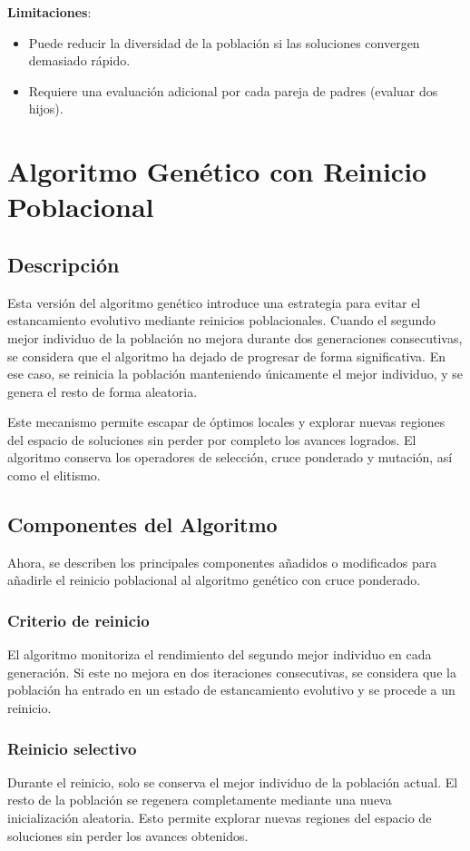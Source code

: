 \textbf{Limitaciones}:
\begin{itemize}
      \item Puede reducir la diversidad de la población si las soluciones convergen demasiado rápido.
      \item Requiere una evaluación adicional por cada pareja de padres (evaluar dos hijos).
\end{itemize}

\section{Algoritmo Genético con Reinicio Poblacional}\label{sec:genetico-v3}
\subsection{Descripción}\label{subsec:descripcion-genetico-v3}
Esta versión del algoritmo genético introduce una estrategia para evitar el estancamiento evolutivo mediante reinicios poblacionales.
Cuando el segundo mejor individuo de la población no mejora durante dos generaciones consecutivas, se considera que el algoritmo ha dejado de progresar de forma significativa.
En ese caso, se reinicia la población manteniendo únicamente el mejor individuo, y se genera el resto de forma aleatoria.


Este mecanismo permite escapar de óptimos locales y explorar nuevas regiones del espacio de soluciones sin perder por completo los avances logrados.
El algoritmo conserva los operadores de selección, cruce ponderado y mutación, así como el elitismo.


\subsection{Componentes del Algoritmo}\label{subsec:componentes-genetico-v3}
Ahora, se describen los principales componentes añadidos o modificados para añadirle el reinicio poblacional al algoritmo genético con cruce ponderado.

\subsubsection{Criterio de reinicio}
El algoritmo monitoriza el rendimiento del segundo mejor individuo en cada generación.
Si este no mejora en dos iteraciones consecutivas, se considera que la población ha entrado en un estado de estancamiento evolutivo y se procede a un reinicio.

\subsubsection{Reinicio selectivo}
Durante el reinicio, solo se conserva el mejor individuo de la población actual.
El resto de la población se regenera completamente mediante una nueva inicialización aleatoria.
Esto permite explorar nuevas regiones del espacio de soluciones sin perder los avances obtenidos.

